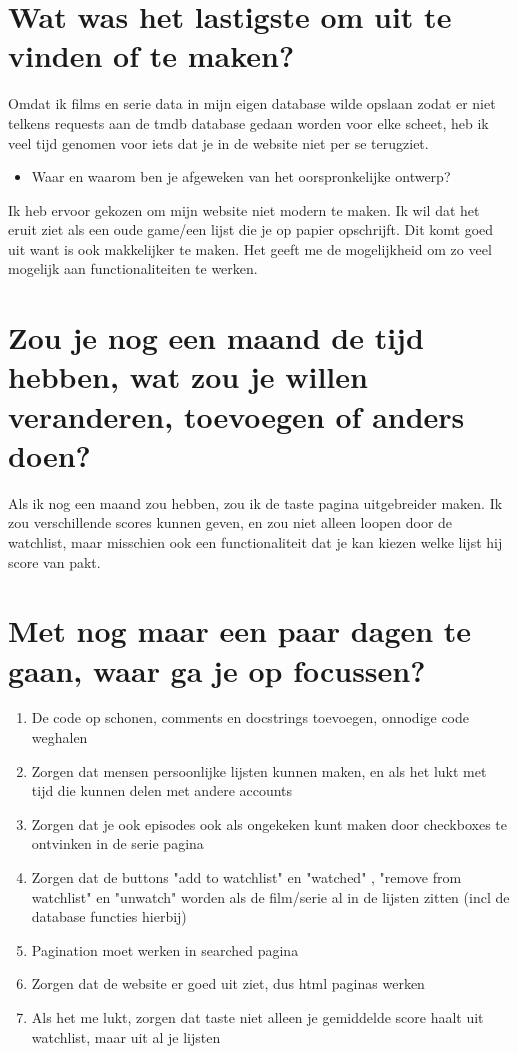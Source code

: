 \documentclass[11pt]{article}
\author{nerd}
\date{\today}
\title{}
\begin{document}
\section{Wat was het lastigste om uit te vinden of te maken?}
\label{sec:org48c4219}
Omdat ik films en serie data in mijn eigen database wilde opslaan zodat er niet telkens requests aan de tmdb database gedaan worden voor elke scheet, heb ik veel tijd genomen voor iets dat je in de website niet per se terugziet.
\begin{itemize}
\item Waar en waarom ben je afgeweken van het oorspronkelijke ontwerp?
\end{itemize}
Ik heb ervoor gekozen om mijn website niet modern te maken. Ik wil dat het eruit ziet als een oude game/een lijst die je op papier opschrijft. Dit komt goed uit want is ook makkelijker te maken. Het geeft me de mogelijkheid om zo veel mogelijk aan functionaliteiten te werken.
\section{Zou je nog een maand de tijd hebben, wat zou je willen veranderen, toevoegen of anders doen?}
\label{sec:org9ee4d79}
Als ik nog een maand zou hebben, zou ik de taste pagina uitgebreider maken. Ik zou verschillende scores kunnen geven, en zou niet alleen loopen door de watchlist, maar misschien ook een functionaliteit dat je kan kiezen welke lijst hij score van pakt.
\section{Met nog maar een paar dagen te gaan, waar ga je op focussen?}
\label{sec:org2fbbfc1}
\begin{enumerate}
\item De code op schonen, comments en docstrings toevoegen, onnodige code weghalen
\item Zorgen dat mensen persoonlijke lijsten kunnen maken, en als het lukt met tijd die kunnen delen met andere accounts
\item Zorgen dat je ook episodes ook als ongekeken kunt maken door checkboxes te ontvinken in de serie pagina
\item Zorgen dat de buttons "add to watchlist" en "watched" , "remove from watchlist" en "unwatch" worden als de film/serie al in de lijsten zitten (incl de database functies hierbij)
\item Pagination moet werken in searched pagina
\item Zorgen dat de website er goed uit ziet, dus html paginas werken
\item Als het me lukt, zorgen dat taste niet alleen je gemiddelde score haalt uit watchlist, maar uit al je lijsten
\end{enumerate}
\end{document}
